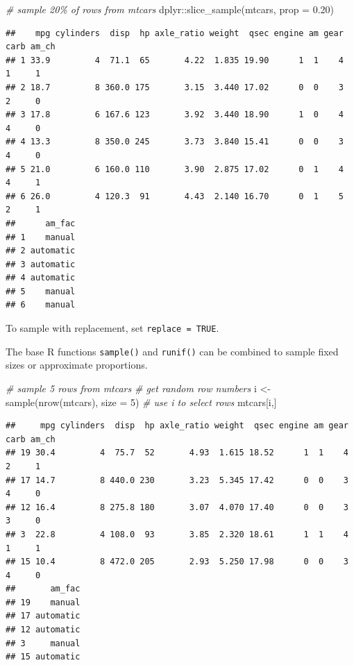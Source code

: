 \documentclass[
]{book}
\newenvironment{Shaded}{\begin{snugshade}}{\end{snugshade}}
\newcommand{\AttributeTok}[1]{\textcolor[rgb]{0.77,0.63,0.00}{#1}}
\newcommand{\CommentTok}[1]{\textcolor[rgb]{0.56,0.35,0.01}{\textit{#1}}}
\newcommand{\DecValTok}[1]{\textcolor[rgb]{0.00,0.00,0.81}{#1}}
\newcommand{\FloatTok}[1]{\textcolor[rgb]{0.00,0.00,0.81}{#1}}
\newcommand{\FunctionTok}[1]{\textcolor[rgb]{0.00,0.00,0.00}{#1}}
\newcommand{\NormalTok}[1]{#1}
\newcommand{\OtherTok}[1]{\textcolor[rgb]{0.56,0.35,0.01}{#1}}
\newcommand{\SpecialCharTok}[1]{\textcolor[rgb]{0.00,0.00,0.00}{#1}}
\begin{document}
\begin{Shaded}
\begin{Highlighting}[]
\CommentTok{\# sample 20\% of rows from mtcars}
\NormalTok{dplyr}\SpecialCharTok{::}\FunctionTok{slice\_sample}\NormalTok{(mtcars, }\AttributeTok{prop =} \FloatTok{0.20}\NormalTok{)}
\end{Highlighting}
\end{Shaded}

\begin{verbatim}
##    mpg cylinders  disp  hp axle_ratio weight  qsec engine am gear carb am_ch
## 1 33.9         4  71.1  65       4.22  1.835 19.90      1  1    4    1     1
## 2 18.7         8 360.0 175       3.15  3.440 17.02      0  0    3    2     0
## 3 17.8         6 167.6 123       3.92  3.440 18.90      1  0    4    4     0
## 4 13.3         8 350.0 245       3.73  3.840 15.41      0  0    3    4     0
## 5 21.0         6 160.0 110       3.90  2.875 17.02      0  1    4    4     1
## 6 26.0         4 120.3  91       4.43  2.140 16.70      0  1    5    2     1
##      am_fac
## 1    manual
## 2 automatic
## 3 automatic
## 4 automatic
## 5    manual
## 6    manual
\end{verbatim}

To sample with replacement, set \texttt{replace\ =\ TRUE}.

The base R functions \texttt{sample()} and \texttt{runif()} can be combined to sample fixed sizes or approximate proportions.

\begin{Shaded}
\begin{Highlighting}[]
\CommentTok{\# sample 5 rows from mtcars}
\CommentTok{\# get random row numbers}
\NormalTok{i }\OtherTok{\textless{}{-}} \FunctionTok{sample}\NormalTok{(}\FunctionTok{nrow}\NormalTok{(mtcars), }\AttributeTok{size =} \DecValTok{5}\NormalTok{)}
\CommentTok{\# use i to select rows}
\NormalTok{mtcars[i,]}
\end{Highlighting}
\end{Shaded}

\begin{verbatim}
##     mpg cylinders  disp  hp axle_ratio weight  qsec engine am gear carb am_ch
## 19 30.4         4  75.7  52       4.93  1.615 18.52      1  1    4    2     1
## 17 14.7         8 440.0 230       3.23  5.345 17.42      0  0    3    4     0
## 12 16.4         8 275.8 180       3.07  4.070 17.40      0  0    3    3     0
## 3  22.8         4 108.0  93       3.85  2.320 18.61      1  1    4    1     1
## 15 10.4         8 472.0 205       2.93  5.250 17.98      0  0    3    4     0
##       am_fac
## 19    manual
## 17 automatic
## 12 automatic
## 3     manual
## 15 automatic
\end{verbatim}
\end{document}
